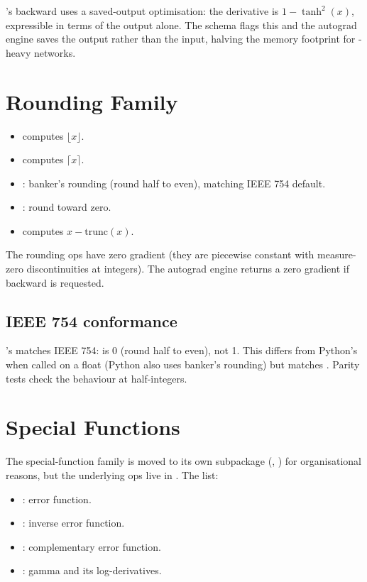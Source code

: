's backward uses a saved-output optimisation: the
derivative is \(1 - \tanh^2(x)\), expressible in terms of the
output alone. The schema flags this and the autograd engine saves
the output rather than the input, halving the memory footprint
for -heavy networks.

\section{Rounding Family}
\label{sec:unary_functions:round}

\begin{itemize}
  \item {} computes $\lfloor x \rfloor$.
  \item {} computes $\lceil x \rceil$.
  \item {}: banker's rounding (round half to even),
    matching IEEE 754 default.
  \item {}: round toward zero.
  \item {} computes $x - \mathrm{trunc}(x)$.
\end{itemize}

The rounding ops have zero gradient (they are piecewise constant
with measure-zero discontinuities at integers). The autograd
engine returns a zero gradient if backward is requested.

\subsection{IEEE 754 conformance}
\label{ssec:unary_functions:ieee754}

\Lucid's  matches IEEE 754:  is 0
(round half to even), not 1. This differs from Python's
 when called on a float (Python also uses banker's
rounding) but matches . Parity tests check the
behaviour at half-integers.

\section{Special Functions}
\label{sec:unary_functions:special}

The special-function family is moved to its own subpackage
(, ) for
organisational reasons, but the underlying ops live in
. The list:

\begin{itemize}
  \item {}: error function.
  \item {}: inverse error function.
  \item {}: complementary error function.
  \item {}: gamma and its
    log-derivatives.
\end{itemize}

